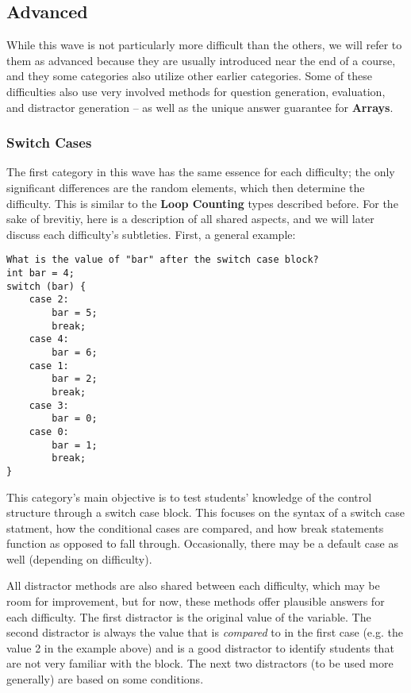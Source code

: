 \documentclass{article}
\begin{document}
\subsection{Advanced} \label{subsec-advanced}

While this wave is not particularly more difficult than the others, we will refer to them as advanced because they are usually introduced near the end of a course, and they some categories also 
utilize other earlier categories. Some of these difficulties also use very involved methods for question generation, evaluation, and distractor generation -- as well as the unique answer guarantee 
for \textbf{Arrays}. 

\subsubsection{Switch Cases} \label{subsubsec-switch_cases}
The first category in this wave has the same essence for each difficulty; the only significant differences are the random elements, which then determine the difficulty. This is similar to the \textbf{Loop 
Counting} types described before. For the sake of brevitiy, here is a description of all shared aspects, and we will later discuss each difficulty's subtleties. First, a general example:

\begin{lstlisting}
What is the value of "bar" after the switch case block?
int bar = 4; 
switch (bar) { 
	case 2: 
		bar = 5; 
		break; 
	case 4: 
		bar = 6; 
	case 1: 
		bar = 2;
		break; 
	case 3: 
		bar = 0; 
	case 0: 
		bar = 1; 
		break; 
} 
\end{lstlisting}


This category's main objective is to test students' knowledge of the control structure through a switch case block. This focuses on the syntax of a switch case statment, how
the conditional cases are compared, and how break statements function as opposed to fall through. Occasionally, there may be a default case as well (depending on difficulty). 

All distractor methods are also shared between each difficulty, which may be room for improvement, but for now, these methods offer plausible answers for each difficulty. The first distractor is
the original value of the variable. The second distractor is always the value that is \textit{compared} to in the first case (e.g. the value 2 in the example above) and is a good distractor to identify students that are not very familiar with the block. The next two distractors (to be used more generally) are based on some conditions. 
\end{document}
